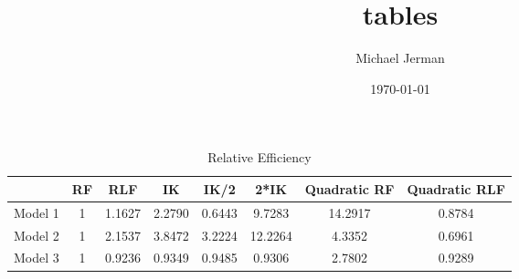 \documentclass[12pt]{article}
\author{Michael Jerman}
\date{\today}
\title{tables}
\begin{document}
\begin{table}
\centering
\caption*{Relative Efficiency}
\begin{tabular}{ccc|ccc|cc}
& RF & RLF & IK & IK/2 & 2*IK & Quadratic RF & Quadratic RLF \\
\hline
Model 1 & 1 & 1.1627 & 2.2790 & 0.6443 & 9.7283 & 14.2917 & 0.8784 \\
Model 2 & 1 & 2.1537 & 3.8472 & 3.2224 & 12.2264 & 4.3352 & 0.6961\\
Model 3 & 1 & 0.9236 & 0.9349 & 0.9485 & 0.9306 & 2.7802 & 0.9289\\
\end{tabular}
\end{table}



\end{document}
